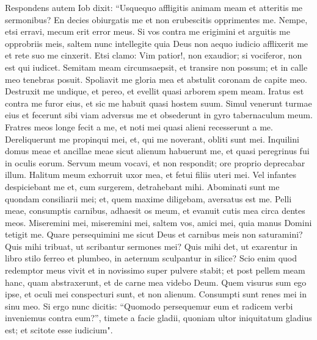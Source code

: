 \begin{biblechapter}  
\verse Respondens autem Iob dixit: 
\verse “Usquequo affligitis animam meam et atteritis me sermonibus? 
\verse En decies obiurgatis me et non erubescitis opprimentes me. 
\verse Nempe, etsi erravi, mecum erit error meus. 
\verse Si vos contra me erigimini et arguitis me opprobriis meis, 
\verse saltem nunc intellegite quia Deus non aequo iudicio afflixerit me et rete suo me cinxerit. 
\verse Etsi clamo: Vim patior!, non exaudior; si vociferor, non est qui iudicet. 
\verse Semitam meam circumsaepsit, et transire non possum; et in calle meo tenebras posuit. 
\verse Spoliavit me gloria mea et abstulit coronam de capite meo. 
\verse Destruxit me undique, et pereo, et evellit quasi arborem spem meam. 
\verse Iratus est contra me furor eius, et sic me habuit quasi hostem suum. 
\verse Simul venerunt turmae eius et fecerunt sibi viam adversus me et obsederunt in gyro tabernaculum meum. 
\verse Fratres meos longe fecit a me, et noti mei quasi alieni recesserunt a me. 
\verse Dereliquerunt me propinqui mei, et, qui me noverant, obliti sunt mei. 
\verse Inquilini domus meae et ancillae meae sicut alienum habuerunt me, et quasi peregrinus fui in oculis eorum. 
\verse Servum meum vocavi, et non respondit; ore proprio deprecabar illum. 
\verse Halitum meum exhorruit uxor mea, et fetui filiis uteri mei. 
\verse Vel infantes despiciebant me et, cum surgerem, detrahebant mihi. 
\verse Abominati sunt me quondam consiliarii mei; et, quem maxime diligebam, aversatus est me. 
\verse Pelli meae, consumptis carnibus, adhaesit os meum, et evanuit cutis mea circa dentes meos. 
\verse Miseremini mei, miseremini mei, saltem vos, amici mei, quia manus Domini tetigit me. 
\verse Quare persequimini me sicut Deus et carnibus meis non saturamini? 
\verse Quis mihi tribuat, ut scribantur sermones mei? Quis mihi det, ut exarentur in libro 
\verse stilo ferreo et plumbeo, in aeternum sculpantur in silice? 
\verse Scio enim quod redemptor meus vivit et in novissimo super pulvere stabit; 
\verse et post pellem meam hanc, quam abstraxerunt, et de carne mea videbo Deum. 
\verse Quem visurus sum ego ipse, et oculi mei conspecturi sunt, et non alienum. Consumpti sunt renes mei in sinu meo. 
\verse Si ergo nunc dicitis: “Quomodo persequemur eum et radicem verbi inveniemus contra eum?”, 
\verse timete a facie gladii, quoniam ultor iniquitatum gladius est; et scitote esse iudicium". 
\end{biblechapter}

